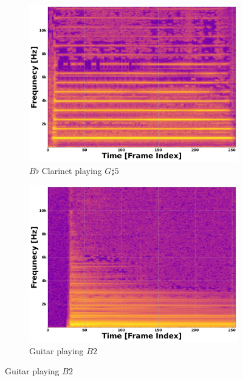 \documentclass[12pt,letterpaper]{article}
\begin{document}
\begin{figure}[H]
	\begin{subfigure}[b]{0.45\textwidth}
	\centering
	\includegraphics[scale=0.2]{../FiguresSpectrogram/Clarinet-Gs5}
	\caption{$B\flat$ Clarinet playing $G\sharp 5$}
	\end{subfigure}
	\hfill
	\begin{subfigure}[b]{0.45\textwidth}
	\centering
	\includegraphics[scale=0.2]{../FiguresSpectrogram/GUITAR-B2}
	\caption{Guitar playing $B2$}
	\end{subfigure}
	

\end{figure}
\end{document}
